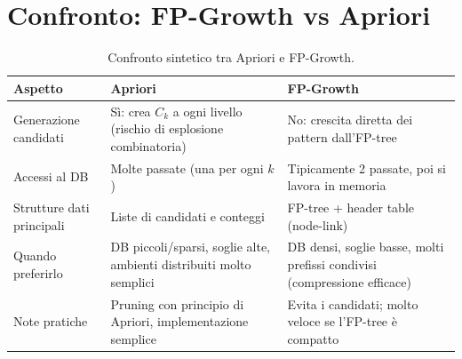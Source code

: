 \section{Confronto: FP-Growth vs Apriori}\label{subsec:confronto-fp-apriori}
\begin{table}[htbp]
\centering
\begin{tabular}{@{}p{}p{}p{}@{}}
\toprule
\textbf{Aspetto} & \textbf{Apriori} & \textbf{FP-Growth} \\
\midrule
Generazione candidati &
Sì: crea $C_k$ a ogni livello (rischio di esplosione combinatoria) &
No: crescita diretta dei pattern dall’FP-tree \\
Accessi al DB &
Molte passate (una per ogni $k$) &
Tipicamente 2 passate, poi si lavora in memoria \\
Strutture dati principali &
Liste di candidati e conteggi &
FP-tree + header table (node-link) \\
Quando preferirlo &
DB piccoli/sparsi, soglie alte, ambienti distribuiti molto semplici &
DB densi, soglie basse, molti prefissi condivisi (compressione efficace) \\
Note pratiche &
Pruning con principio di Apriori, implementazione semplice &
Evita i candidati; molto veloce se l’FP-tree è compatto \\
\bottomrule
\end{tabular}
\caption{Confronto sintetico tra Apriori e FP-Growth.}
\label{tab:apriori-vs-fpgrowth}
\end{table}